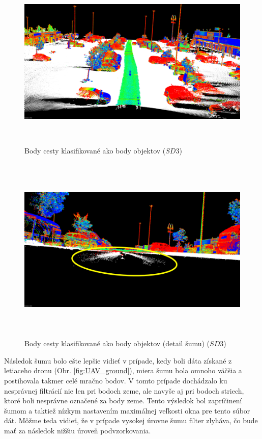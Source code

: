 \begin{figure}[!htbp]
  \centering
  \includegraphics[width=16cm, height=8.5cm]{img/Parking_ground.png}
  \caption{Body cesty klasifikované ako body objektov ($SD3$)} 
  \label{fig:Parking_ground}
\end{figure}

\begin{figure}[!htbp]
  \centering
  \includegraphics[width=16cm, height=9cm]{img/Parking_ground_detail.png}
  \caption{Body cesty klasifikované ako body objektov (detail šumu) ($SD3$)} 
  \label{fig:Parking_ground_detail}
\end{figure}

\indent Následok šumu bolo ešte lepšie vidieť v prípade, kedy boli dáta získané z letiaceho dronu (Obr. \ref{fig:UAV_ground}), miera šumu bola omnoho väčšia a postihovala takmer celé mračno bodov. V tomto prípade dochádzalo ku nesprávnej filtrácií nie len pri bodoch zeme, ale navyše aj pri bodoch striech, ktoré boli nesprávne označené za body zeme. Tento výsledok bol zapríčinení šumom a taktiež nízkym nastavením maximálnej veľkosti okna pre tento súbor dát. Môžme teda vidieť, že v prípade vysokej úrovne šumu filter zlyháva, čo bude mať za následok nižšiu úroveň podvzorkovania. 


